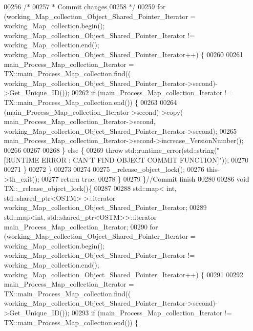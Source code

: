 \begin{DoxyCode}
00256         \textcolor{comment}{/*}
00257 \textcolor{comment}{         * Commit changes}
00258 \textcolor{comment}{         */}
00259         \textcolor{keywordflow}{for} (working\_Map\_collection\_Object\_Shared\_Pointer\_Iterator = working\_Map\_collection.begin(); 
      working\_Map\_collection\_Object\_Shared\_Pointer\_Iterator != working\_Map\_collection.end(); 
      working\_Map\_collection\_Object\_Shared\_Pointer\_Iterator++) \{
00260             
00261                 main\_Process\_Map\_collection\_Iterator = TX::main\_Process\_Map\_collection.find((
      working\_Map\_collection\_Object\_Shared\_Pointer\_Iterator->second)->Get\_Unique\_ID());
00262                 \textcolor{keywordflow}{if} (main\_Process\_Map\_collection\_Iterator != TX::main\_Process\_Map\_collection.end()) \{
00263 
00264                     (main\_Process\_Map\_collection\_Iterator->second)->copy(
      main\_Process\_Map\_collection\_Iterator->second, working\_Map\_collection\_Object\_Shared\_Pointer\_Iterator->second);
00265                     main\_Process\_Map\_collection\_Iterator->second->increase\_VersionNumber();
00266 
00267 
00268                 \} \textcolor{keywordflow}{else} \{
00269                     \textcolor{keywordflow}{throw} std::runtime\_error(std::string(\textcolor{stringliteral}{"[RUNTIME ERROR : CAN'T FIND OBJECT COMMIT
       FUNCTION]"}));
00270 
00271                 \}
00272         \}
00273 
00274 
00275         \_release\_object\_lock();
00276         this->th\_exit();
00277         \textcolor{keywordflow}{return} \textcolor{keyword}{true};
00278     \}
00279 \}\textcolor{comment}{//Commit finish}
00280 
00286 \textcolor{keywordtype}{void} TX::\_release\_object\_lock()\{
00287     
00288     std::map< int, std::shared\_ptr<OSTM> >::iterator working\_Map\_collection\_Object\_Shared\_Pointer\_Iterator;
00289     std::map<int, std::shared\_ptr<OSTM>>::iterator main\_Process\_Map\_collection\_Iterator;
00290     \textcolor{keywordflow}{for} (working\_Map\_collection\_Object\_Shared\_Pointer\_Iterator = working\_Map\_collection.begin(); 
      working\_Map\_collection\_Object\_Shared\_Pointer\_Iterator != working\_Map\_collection.end(); 
      working\_Map\_collection\_Object\_Shared\_Pointer\_Iterator++) \{
00291 
00292             main\_Process\_Map\_collection\_Iterator = TX::main\_Process\_Map\_collection.find((
      working\_Map\_collection\_Object\_Shared\_Pointer\_Iterator->second)->Get\_Unique\_ID());
00293             \textcolor{keywordflow}{if} (main\_Process\_Map\_collection\_Iterator != TX::main\_Process\_Map\_collection.end()) \{

\end{DoxyCode}
